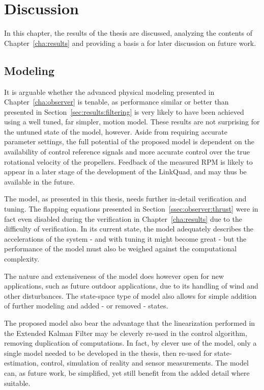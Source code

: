\chapter{Discussion}
\label{cha:discussion}
    In this chapter, the results of the thesis are discussed,
    analyzing the contents of Chapter~\ref{cha:results} and providing
    a basis a for later discussion on future work.

    \section{Modeling}
        It is arguable whether the advanced physical modeling presented
        in Chapter~\ref{cha:observer} is tenable, as performance similar or better
        than presented in Section~\ref{sec:results:filtering} is very likely
        to have been achieved using a well tuned, far simpler, motion model.
        These results are not surprising for the untuned state of the model, however.
        Aside from requiring accurate parameter settings, the full potential of the
        proposed model is dependent on the availability of control reference
        signals and more accurate control over the true rotational velocity of
        the propellers. Feedback of the measured RPM is likely to appear in
        a later stage of the development of the LinkQuad, and may thus
        be available in the future.

        The model, as presented in this thesis, needs further in-detail
        verification and tuning. The flapping equations presented in
        Section~\ref{ssec:observer:thrust} were in fact even disabled during
        the verification in Chapter~\ref{cha:results} due to the
        difficulty of verification. In its current state, the model
        adequately describes the accelerations of the system - and with tuning it might become great -
        but the performance of the model must also be weighed against
        the computational complexity.

        The nature and extensiveness of the model does however open
        for new applications, such as future outdoor applications, due
        to its handling of wind and other disturbances.
        The state-space type of model also allows for simple addition
        of further modeling and added - or removed - states.

        The proposed model also bear the advantage that the
        linearization performed in the Extended Kalman Filter
        may be cleverly re-used in the control algorithm, removing duplication
        of computations. In fact, by clever use of the model,
        only a single model needed to be developed in the thesis, then re-used for
        state-estimation, control, simulation of reality and sensor measurements.
        The model can, as future work, be simplified, yet still benefit from the
        added detail where suitable.

